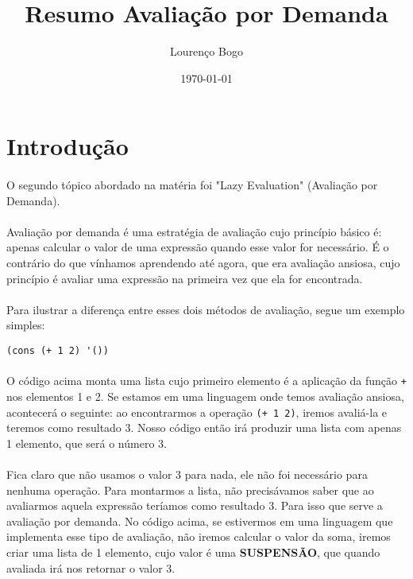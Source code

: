 \documentclass[11pt]{article}
\author{Lourenço Bogo}
\date{\today}
\title{Resumo Avaliação por Demanda}
\begin{document}
\maketitle
\tableofcontents

\newpage
\section{Introdução}
\label{sec:org2f6528c}
\paragraph{} O segundo tópico abordado na matéria foi "Lazy Evaluation" (Avaliação por Demanda).

\paragraph{} Avaliação por demanda é uma estratégia de avaliação cujo princípio básico é: apenas calcular o valor de uma expressão quando
esse valor for necessário. É o contrário do que vínhamos aprendendo até agora, que era avaliação ansiosa, cujo princípio é avaliar uma
expressão na primeira vez que ela for encontrada.

\paragraph{} Para ilustrar a diferença entre esses dois métodos de avaliação, segue um exemplo simples:

\begin{verbatim}
(cons (+ 1 2) '())
\end{verbatim}

\paragraph{} O código acima monta uma lista cujo primeiro elemento é a aplicação da função \texttt{+} nos elementos 1 e 2. Se estamos em uma linguagem onde temos
avaliação ansiosa, acontecerá o seguinte: ao encontrarmos a operação \texttt{(+ 1 2)}, iremos avaliá-la e teremos como resultado 3. Nosso código
então irá produzir uma lista com apenas 1 elemento, que será o número 3.

\paragraph{} Fica claro que não usamos o valor 3 para nada, ele não foi necessário para nenhuma operação. Para montarmos a lista, não precisávamos saber
que ao avaliarmos aquela expressão teríamos como resultado 3. Para isso que serve a avaliação por demanda. No código acima, se estivermos
em uma linguagem que implementa esse tipo de avaliação, não iremos calcular o valor da soma, iremos criar uma lista de 1 elemento, cujo
valor é uma \textbf{SUSPENSÃO}, que quando avaliada irá nos retornar o valor 3.
\end{document}
